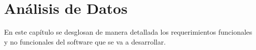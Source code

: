 \chapter{Análisis de Datos}
En este capítulo se desglosan de manera detallada los requerimientos funcionales y no funcionales del software que se va a desarrollar.


